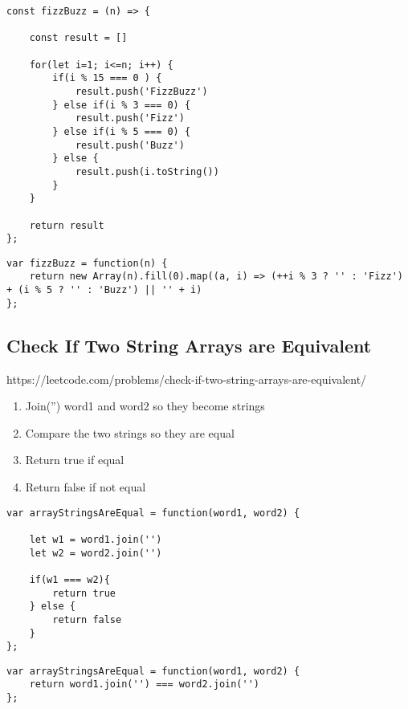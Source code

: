 \documentclass[10pt]{article}
\begin{document}
\begin{lstlisting}[title=Solution fizzBuzz with for loop, captionpos=t]
const fizzBuzz = (n) => {

    const result = []
    
    for(let i=1; i<=n; i++) {
        if(i % 15 === 0 ) {
            result.push('FizzBuzz')
        } else if(i % 3 === 0) {
            result.push('Fizz')
        } else if(i % 5 === 0) {
            result.push('Buzz')
        } else {
            result.push(i.toString())
        }
    }
    
    return result
};
\end{lstlisting}

\begin{lstlisting}[title=Solution fizzBuzz ES6, captionpos=t]
var fizzBuzz = function(n) {
    return new Array(n).fill(0).map((a, i) => (++i % 3 ? '' : 'Fizz') + (i % 5 ? '' : 'Buzz') || '' + i)
};
\end{lstlisting}
\medskip %







\pagebreak %
\medskip 
\subsection{Check If Two String Arrays are Equivalent}
https://leetcode.com/problems/check-if-two-string-arrays-are-equivalent/

\begin{enumerate}
	\item Join('') word1 and word2 so they become strings
	\item Compare the two strings so they are equal
	\item Return true if equal
	\item Return false if not equal
\end{enumerate}

\begin{lstlisting}[title=Solution arrayStringsAreEqual, captionpos=t]
var arrayStringsAreEqual = function(word1, word2) {
    
    let w1 = word1.join('')
    let w2 = word2.join('')
    
    if(w1 === w2){
        return true
    } else {
        return false
    }
};
\end{lstlisting}

\begin{lstlisting}[title=Solution arrayStringsAreEqual ES6, captionpos=t]
var arrayStringsAreEqual = function(word1, word2) {
    return word1.join('') === word2.join('')
};
\end{lstlisting}
\medskip %
\end{document}
